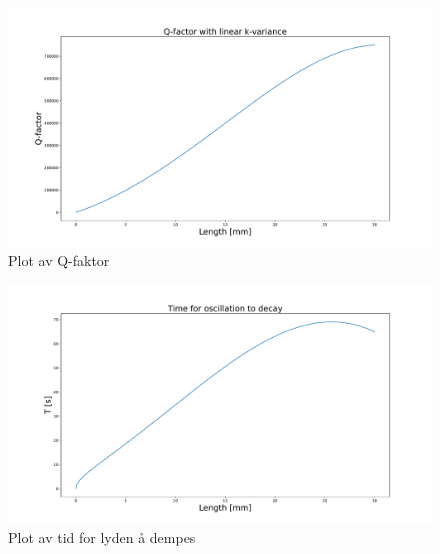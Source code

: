 \documentclass{article}
\begin{document}
\begin{enumerate}[a)]
\begin{figure}[h!]
  \centering
  \includegraphics[width = \textwidth]{figs/2.c.pdf}
  \caption{Plot av Q-faktor}
  \label{fig: 2.c}
\end{figure}


\newpage
\begin{figure}[h!]
  \item 
  \centering
  \includegraphics[width = \textwidth]{figs/2.d.pdf}
  \caption{Plot av tid for lyden å dempes}
  \label{fig: 2.d}
\end{figure}
\end{enumerate}
\end{document}
